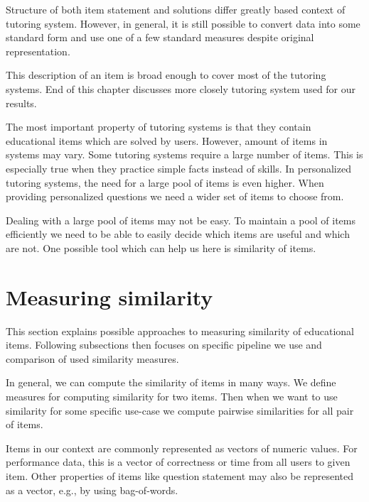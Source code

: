\documentclass[
  digital, %
  table,   %
  nolof,     %
  nolot,     %
  nocover,
  color
]{fithesis3}
\begin{document}
Structure of both item statement and solutions differ greatly based context of tutoring system. However, in general, it is still possible to convert data into some standard form and use one of a few standard measures despite original representation.

This description of an item is broad enough to cover most of the tutoring systems. End of this chapter discusses more closely tutoring system used for our results.


The most important property of tutoring systems is that they contain educational items which are solved by users. However, amount of items in systems may vary. Some tutoring systems require a large number of items. This is especially true when they practice simple facts instead of skills. In personalized tutoring systems, the need for a large pool of items is even higher. When providing personalized questions we need a wider set of items to choose from.


Dealing with a large pool of items may not be easy. To maintain a pool of items efficiently we need to be able to easily decide which items are useful and which are not. One possible tool which can help us here is similarity of items.


\section{Measuring similarity}\label{measuring-similarity}

This section explains possible approaches to measuring similarity of educational items. Following subsections then focuses on specific pipeline we use and comparison of used similarity measures.


In general, we can compute the similarity of items in many ways. We define measures for computing similarity for two items. Then when we want to use similarity for some specific use-case we compute pairwise similarities for all pair of items.

Items in our context are commonly represented as vectors of numeric values. For performance data, this is a vector of correctness or time from all users to given item. Other properties of items like question statement may also be represented as a vector, e.g., by using bag-of-words.
\end{document}
